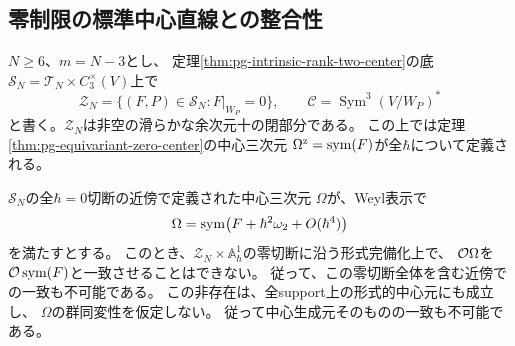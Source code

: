 \subsection{零制限の標準中心直線との整合性}

\begin{proposition}[零制限の中心直線への大域的一致の障害]
\label{prop:pg-intrinsic-zero-matching-obstruction}
$N\ge6$、$m=N-3$とし、
定理\ref{thm:pg-intrinsic-rank-two-center}の底
$\mathcal S_N=\mathcal T_N\times C_3^\times(V)$上で
\begin{equation}
 \mathcal Z_N=
 \{(F,P)\in\mathcal S_N:F|_{W_P}=0\},\qquad
 \mathcal C=\operatorname{Sym}^3(V/W_P)^*
 \label{eq:pg-intrinsic-zero-incidence}
\end{equation}
と書く。$\mathcal Z_N$は非空の滑らかな余次元十の閉部分である。
この上では定理\ref{thm:pg-equivariant-zero-center}の中心三次元
$\Omega^{\mathrm z}=\operatorname{sym}(F)$が全$\hbar$について定義される。

$\mathcal S_N$の全$\hbar=0$切断の近傍で定義された中心三次元
$\Omega$が、Weyl表示で
\begin{equation}
 \Omega=\operatorname{sym}\bigl(F+\hbar^2\omega_2+O(\hbar^4)\bigr)
 \label{eq:pg-intrinsic-zero-comparison-jet}
\end{equation}
を満たすとする。
このとき、$\mathcal Z_N\times\mathbb A^1_\hbar$の零切断に沿う形式完備化上で、
$\mathcal O\Omega$を$\mathcal O\operatorname{sym}(F)$と一致させることはできない。
従って、この零切断全体を含む近傍での一致も不可能である。
この非存在は、全support上の形式的中心元にも成立し、
$\Omega$の群同変性を仮定しない。
従って中心生成元そのものの一致も不可能である。
\end{proposition}

